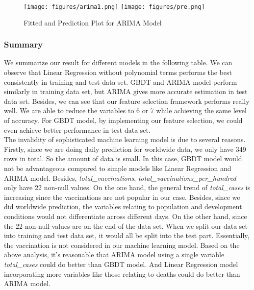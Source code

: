 \documentclass{article}
\begin{document}
\begin{figure}[H]
    \centering
    \texttt{[image: figures/arima1.png]}
    \texttt{[image: figures/pre.png]}
    \caption{Fitted and Prediction Plot for ARIMA Model}
    \label{fig:violin}
\end{figure}


\subsubsection{Summary}

We summarize our result for different models in the following table. We can observe that Linear Regression without polynomial terms performs the best consistently in training and test data set. GBDT and ARIMA model perform similarly in training data set, but ARIMA gives more accurate estimation in test data set. Besides, we can see that our feature selection framework performs really well. We are able to reduce the variables to 6 or 7 while achieving the same level of accuracy. For GBDT model, by implementing our feature selection, we could even achieve better performance in test data set. \\

\noindent The invalidity of sophisticated machine learning model is due to several reasons. Firstly, since we are doing daily prediction for worldwide data, we only have 349 rows in total. So the amount of data is small. In this case, GBDT model would not be advantageous compared to simple models like Linear Regression and ARIMA model. Besides, \textit{total\_vaccinations}, \textit{total\_vaccinations\_per\_hundred} only have 22 non-null values. On the one hand, the general trend of \textit{total\_cases} is increasing since the vaccinations are not popular in our case. Besides, since we did worldwide prediction, the variables relating to population and development conditions would not differentiate across different days. On the other hand, since the 22 non-null values are on the end of the data set. When we split our data set into training and test data set, it would all be split into the test part. Essentially, the vaccination is not considered in our machine learning model. Based on the above analysis, it's reasonable that ARIMA model using a single variable \textit{total\_cases} could do better than GBDT model. And Linear Regression model incorporating more variables like those relating to deaths could do better than ARIMA model.
\end{document}
